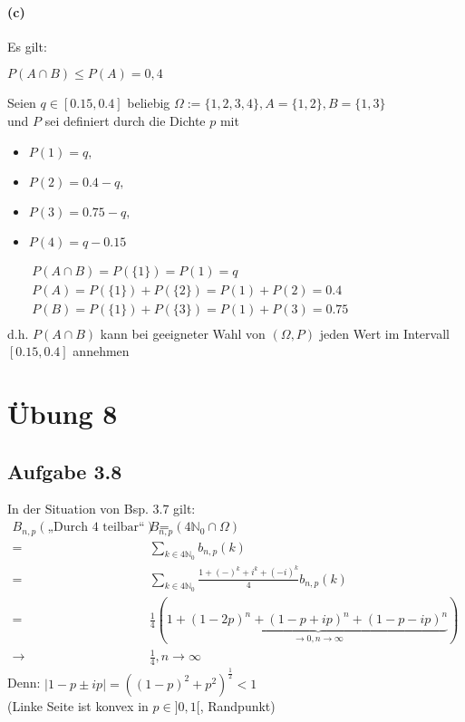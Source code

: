 \documentclass[10pt, a4paper]{article}
\begin{document}
\paragraph*{(c)}
Es gilt:
\begin{center}
	$P(A\cap B)\leq P(A)=0,4$
\end{center}
Seien $q\in[0.15,0.4]$ beliebig $\Omega:=\{1,2,3,4\}, A=\{1,2\},B=\{1,3\}$	\\ und $P$ sei definiert durch die Dichte $p$ mit
\begin{itemize}
	\item[] $P(1)=q,$
	\item[] $P(2)=0.4-q,$
	\item[] $P(3)=0.75-q,$
	\item[] $P(4)=q-0.15$
\end{itemize}
\begin{align*}
	&P(A\cap B)=P(\{1\})=P(1)=q	\hspace{200pt}\\
	&P(A)=P(\{1\})+P(\{2\})=P(1)+P(2)=0.4	\\
	&P(B)=P(\{1\})+P(\{3\})=P(1)+P(3)=0.75	\\
\end{align*}
d.h. $P(A\cap B)$ kann bei geeigneter Wahl von $(\Omega, P)$ jeden Wert im Intervall $[0.15,0.4]$ annehmen



\section{Übung 8}
\subsection{Aufgabe 3.8}
In der Situation von Bsp. 3.7 gilt:
\begin{align*}
	B_{n,p}(\text{„Durch 4 teilbar“})=&B_{n,p}(4\mathbb{N}_{0}\cap\Omega)	\hspace{200pt}\\
	=&\sum_{k\in4\mathbb{N}_{0}}b_{n,p}(k)	\\
	=&\sum_{k\in4\mathbb{N}_{0}}\frac{1+(-)^{k}+i^{k}+(-i)^{k}}{4}b_{n,p}(k)	\\
	=&\frac{1}{4}(1+\underbrace{(1-2p)^{n}+(1-p+ip)^{n}+(1-p-ip)^{n}}_{\rightarrow0,n\rightarrow\infty})	\\
	\rightarrow& \frac{1}{4}, n\rightarrow\infty
\end{align*}
Denn: $|1-p\pm ip|=((1-p)^{2}+p^{2})^{\frac{1}{2}}<1$	\\
(Linke Seite ist konvex in $p\in]0,1[$, Randpunkt)
\end{document}
